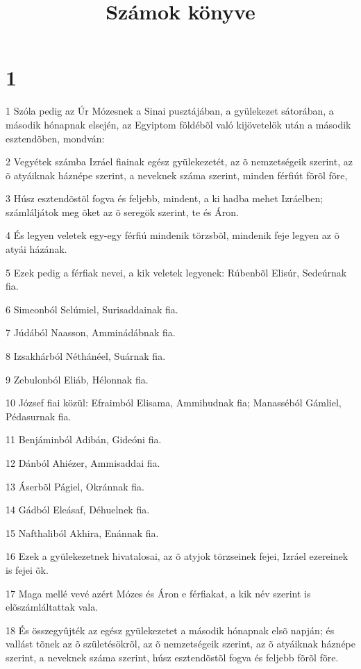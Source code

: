 

\title{Számok könyve}


\chapter{1}

\par 1 Szóla pedig az Úr Mózesnek a Sinai pusztájában, a gyülekezet sátorában, a második hónapnak elsején, az Egyiptom földébõl való kijövetelök után a második esztendõben, mondván:
\par 2 Vegyétek számba Izráel fiainak egész gyülekezetét, az õ nemzetségeik szerint, az õ atyáiknak háznépe szerint, a neveknek száma szerint, minden férfiút fõrõl fõre,
\par 3 Húsz esztendõstõl fogva és feljebb, mindent, a ki hadba mehet Izráelben; számláljátok meg õket az õ seregök szerint, te és Áron.
\par 4 És legyen veletek egy-egy férfiú mindenik törzsbõl, mindenik feje legyen az õ atyái házának.
\par 5 Ezek pedig a férfiak nevei, a kik veletek legyenek: Rúbenbõl Elisúr, Sedeúrnak fia.
\par 6 Simeonból Selúmiel, Surisaddainak fia.
\par 7 Júdából Naasson, Amminádábnak fia.
\par 8 Izsakhárból Néthánéel, Suárnak fia.
\par 9 Zebulonból Eliáb, Hélonnak fia.
\par 10 József fiai közül: Efraimból Elisama, Ammihudnak fia; Manasséból Gámliel, Pédasurnak fia.
\par 11 Benjáminból Adibán, Gideóni fia.
\par 12 Dánból Ahiézer, Ammisaddai fia.
\par 13 Áserbõl Págiel, Okránnak fia.
\par 14 Gádból Eleásaf, Déhuelnek fia.
\par 15 Nafthaliból Akhira, Enánnak fia.
\par 16 Ezek a gyülekezetnek hivatalosai, az õ atyjok törzseinek fejei, Izráel ezereinek is fejei õk.
\par 17 Maga mellé vevé azért Mózes és Áron e férfiakat, a kik név szerint is elõszámláltattak vala.
\par 18 És összegyûjték az egész gyülekezetet a második hónapnak elsõ napján; és vallást tõnek az õ születésökrõl, az õ nemzetségeik szerint, az õ atyáiknak háznépe szerint, a neveknek száma szerint, húsz esztendõstõl fogva és feljebb fõrõl fõre.
